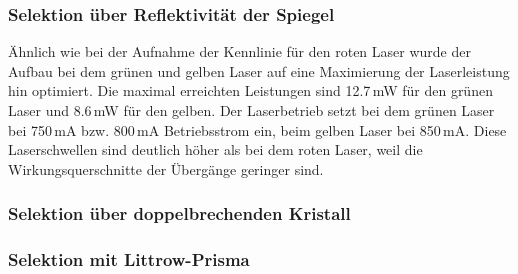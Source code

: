 \subsubsection{Selektion über Reflektivität der Spiegel}

Ähnlich wie bei der Aufnahme der Kennlinie für den roten Laser wurde der Aufbau bei dem grünen und
gelben Laser auf eine Maximierung der Laserleistung hin optimiert.
Die maximal erreichten Leistungen sind 12.7\,mW für den grünen Laser und 8.6\,mW für den gelben.
Der Laserbetrieb setzt bei dem grünen Laser bei 750\,mA bzw. 800\,mA Betriebsstrom ein,
beim gelben Laser bei 850\,mA.
Diese Laserschwellen sind deutlich höher als bei dem roten Laser,
weil die Wirkungsquerschnitte der Übergänge geringer sind.

\subsubsection{Selektion über doppelbrechenden Kristall}

\subsubsection{Selektion mit Littrow-Prisma}

